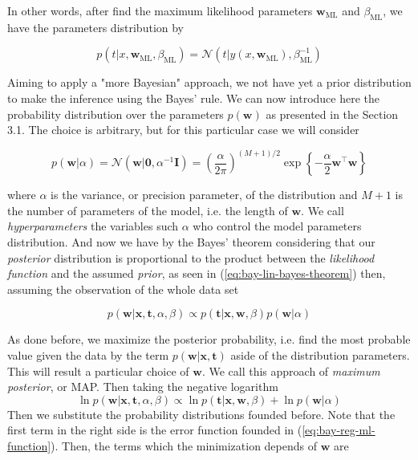 \documentclass[11pt]{article} %
\begin{document}
In other words, after find the maximum likelihood parameters $\mathbf{w}_\text{ML}$ and $\beta_\text{ML}$, we have the parameters distribution by

\begin{equation}
   p\left(t | x, \mathbf{w}_{\mathrm{ML}}, \beta_{\mathrm{ML}}\right)=\mathcal{N}\left(t | y\left(x, \mathbf{w}_{\mathrm{ML}}\right), \beta_{\mathrm{ML}}^{-1}\right)
\end{equation}

Aiming to apply a "more Bayesian" approach, we not have yet a prior distribution to make the inference using the Bayes' rule. We can now introduce here the probability distribution over the parameters $p(\mathbf{w})$ as presented in the Section 3.1. The choice is arbitrary, but for this particular case we will consider

\begin{equation}
   \label{eq:bay-lin-reg-prior-dist}
   p(\mathbf{w} | \alpha)=\mathcal{N}\left(\mathbf{w} | \mathbf{0}, \alpha^{-1} \mathbf{I}\right)=\left(\frac{\alpha}{2 \pi}\right)^{(M+1) / 2} \exp \left\{-\frac{\alpha}{2} \mathbf{w}^\top \mathbf{w}\right\}
\end{equation}

where $\alpha$ is the variance, or precision parameter, of the distribution and $M+1$ is the number of parameters of the model, i.e. the length of $\mathbf{w}$. We call \textit{hyperparameters} the variables such $\alpha$ who control the model parameters distribution. And now we have by the Bayes' theorem considering that our \textit{posterior} distribution is proportional to the product between the \textit{likelihood function} and the assumed \textit{prior}, as seen in (\ref{eq:bay-lin-bayes-theorem}) then, assuming the observation of the whole data set

\begin{equation}
   p(\mathbf{w} | \mathbf{x}, \mathbf{t}, \alpha, \beta) \propto p(\mathbf{t} | \mathbf{x}, \mathbf{w}, \beta) p(\mathbf{w} | \alpha)
\end{equation}

As done before, we maximize the posterior probability, i.e. find the most probable value given the data by the term $p(\mathbf{w} | \mathbf{x}, \mathbf{t}) $ aside of the distribution parameters. This will result a particular choice of $\mathbf{w}$. We call this approach of \textit{maximum posterior}, or MAP. Then taking the negative logarithm
%
\begin{equation}
   \ln p(\mathbf{w} | \mathbf{x}, \mathbf{t}, \alpha, \beta) \propto \ln p(\mathbf{t} | \mathbf{x}, \mathbf{w}, \beta) + \ln p(\mathbf{w} | \alpha)
\end{equation}
%
Then we substitute the probability distributions founded before. Note that the first term in the right side is the error function founded in (\ref{eq:bay-reg-ml-function}). Then, the terms which the minimization depends of $\mathbf{w}$ are
\end{document}
